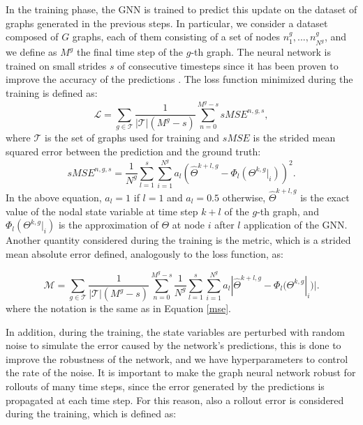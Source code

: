 \documentclass[11pt,a4paper]{article}
\begin{document}
In the training phase, the GNN is trained to predict this update on the dataset of graphs generated in the previous steps. 
In particular, we consider a dataset composed of \(G\) graphs, each of them consisting of a set of nodes \(n_1^g,...,n_{N^g}^g\), and we define as \(M^g\) the final time step of the \(g\)-th graph.
The neural network is trained on small strides \(s\) of consecutive timesteps since it has been proven to improve the accuracy of the predictions \cite{Luca}.
The loss function minimized during the training is defined as:
\begin{equation}
    \mathcal{L} = \sum_{g \in \mathcal{T}} \frac{1}{|\mathcal{T}|(M^g-s)} \sum_{n=0}^{M^g-s} sMSE^{n,g,s},
\end{equation}
where \(\mathcal{T}\) is the set of graphs used for training and \(sMSE\) is the strided mean squared error between the prediction and the ground truth:
\begin{equation}
    sMSE^{n,g,s} = \frac{1}{N^g} \sum_{l=1}^{s} \sum_{i=1}^{N^g} a_l (\hat{\Theta}^{k+l,g} - \Phi_l(\Theta^{k,g}|_i))^2.
    \label{mse}
\end{equation}
In the above equation, \(a_l=1\) if \(l=1\) and \(a_l=0.5\) otherwise, \(\hat{\Theta}^{k+l,g}\) is the exact value of the nodal state variable at time step \(k+l\) of the \(g\)-th graph, and \(\Phi_l(\Theta^{k,g}|_i)\) is the approximation of \(\Theta\) at node \(i\) after \(l\) application of the GNN. 
Another quantity considered during the training is the metric, which is a strided mean absolute error defined, analogously to the loss function, as:

\begin{equation}
    \mathcal{M} = \sum_{g \in \mathcal{T}} \frac{1}{|\mathcal{T}|(M^g-s)} \sum_{n=0}^{M^g-s} \frac{1}{N^g} \sum_{l=1}^{s} \sum_{i=1}^{N^g} a_l |\hat{\Theta}^{k+l,g} - \Phi_l(\Theta^{k,g}|_i)|.
    \label{metric}
\end{equation}
where the notation is the same as in Equation \eqref{mse}.

In addition, during the training, the state variables are perturbed with random noise to simulate the error caused by the network's predictions, this is done to improve the robustness of the network, and we have hyperparameters to control the rate of the noise. 
It is important to make the graph neural network robust for rollouts of many time steps, since the error generated by the predictions is propagated at each time step. 
For this reason, also a rollout error is considered during the training, which is defined as:
\end{document}

